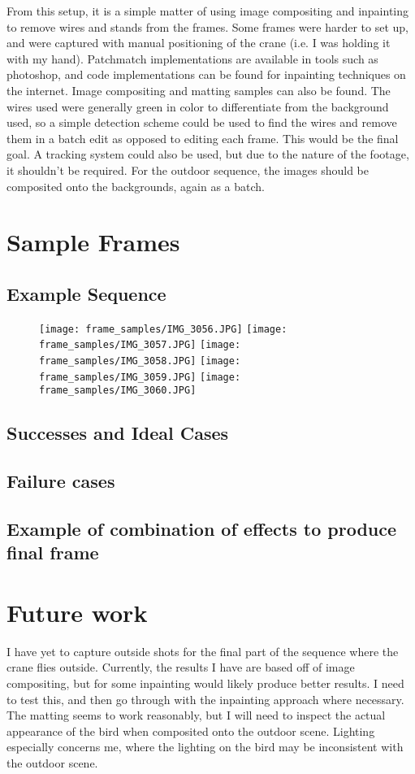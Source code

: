 \documentclass[12pt]{article}
\begin{document}
		From this setup, it is a simple matter of using image compositing and inpainting to remove wires and stands from the frames.  Some frames were harder to set up, and were captured with manual positioning of the crane (i.e. I was holding it with my hand).  Patchmatch implementations are available in tools such as photoshop, and code implementations can be found for inpainting techniques on the internet.  Image compositing and matting samples can also be found.  The wires used were generally green in color to differentiate from the background used, so a simple detection scheme could be used to find the wires and remove them in a batch edit as opposed to editing each frame.  This would be the final goal.  A tracking system could also be used, but due to the nature of the footage, it shouldn't be required.  For the outdoor sequence, the images should be composited onto the backgrounds, again as a batch.
		
	\section{Sample Frames}
        \subsection{Example Sequence}
            \begin{figure}[H]
                \centering
                \texttt{[image: frame\_samples/IMG\_3056.JPG]}
                \texttt{[image: frame\_samples/IMG\_3057.JPG]}
                \texttt{[image: frame\_samples/IMG\_3058.JPG]}
                \texttt{[image: frame\_samples/IMG\_3059.JPG]}
                \texttt{[image: frame\_samples/IMG\_3060.JPG]}
            \end{figure}
        \subsection{Successes and Ideal Cases}
        \subsection{Failure cases}
        \subsection{Example of combination of effects to produce final frame}
	\section{Future work}
		I have yet to capture outside shots for the final part of the sequence where the crane flies outside.  Currently, the results I have are based off of image compositing, but for some inpainting would likely produce better results.  I need to test this, and then go through with the inpainting approach where necessary.  The matting seems to work reasonably, but I will need to inspect the actual appearance of the bird when composited onto the outdoor scene.  Lighting especially concerns me, where the lighting on the bird may be inconsistent with the outdoor scene.
\end{document}
